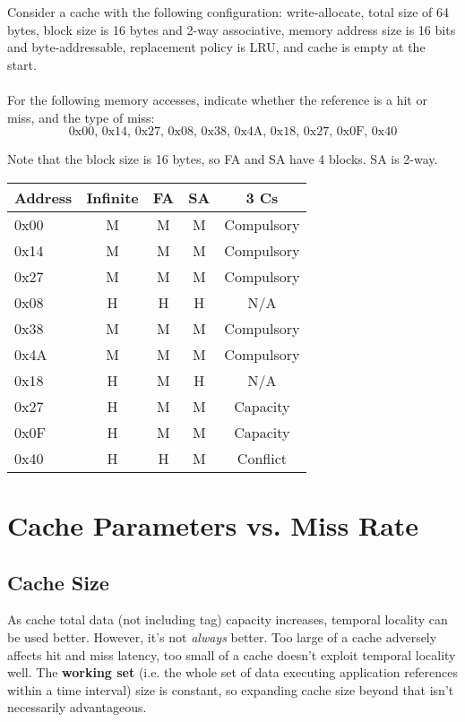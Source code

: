 \begin{problem}
  Consider a cache with the following configuration: write-allocate, total size of 64 bytes, block size is 16 bytes and 2-way associative, memory address size is 16 bits and byte-addressable, replacement policy is LRU, and cache is empty at the start. \\
  \\
  For the following memory accesses, indicate whether the reference is a hit or miss, and the type of miss:
  \[
    \text{0x00, 0x14, 0x27, 0x08, 0x38, 0x4A, 0x18, 0x27, 0x0F, 0x40}
  \]
\end{problem}
\begin{answer}
  Note that the block size is 16 bytes, so FA and SA have 4 blocks. SA is 2-way.
  \begin{center}
    \begin{tabular}{|l|c|c|c|c|}
      \hline
      Address & Infinite & FA & SA & 3 Cs \\
      \hline
      0x00 & M & M & M & Compulsory \\
      0x14 & M & M & M & Compulsory \\
      0x27 & M & M & M & Compulsory \\
      0x08 & H & H & H & N/A \\
      0x38 & M & M & M & Compulsory \\
      0x4A & M & M & M & Compulsory \\
      0x18 & H & M & H & N/A \\
      0x27 & H & M & M & Capacity \\
      0x0F & H & M & M & Capacity \\
      0x40 & H & H & M & Conflict \\
      \hline
    \end{tabular}
  \end{center}
\end{answer}

\section{Cache Parameters vs. Miss Rate}

\subsection{Cache Size}
As cache total data (not including tag) capacity increases, temporal locality can be used better. However, it's not \emph{always} better. Too large of a cache adversely affects hit and miss latency, too small of a cache doesn't exploit temporal locality well. The \textbf{working set} (i.e. the whole set of data executing application references within a time interval) size is constant, so expanding cache size beyond that isn't necessarily advantageous.

